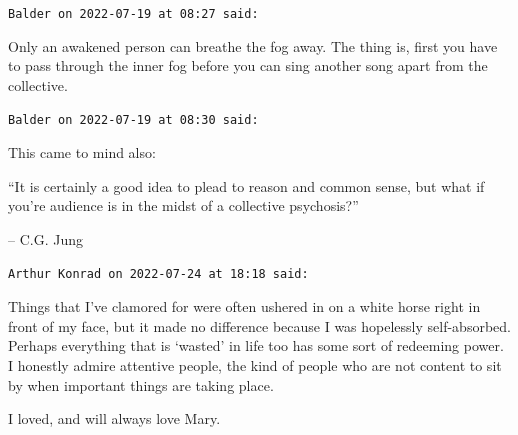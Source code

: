 \begin{footnotesize}
\begin{sffamily}
\texttt{Balder on 2022-07-19 at 08:27 said:}

Only an awakened person can breathe the fog away. The thing is, first you have to pass through the inner fog before you can sing another song apart from the collective.

\hfill

\texttt{Balder on 2022-07-19 at 08:30 said:}

This came to mind also:

``It is certainly a good idea to plead to reason and common sense, but what if you're audience is in the midst of a collective psychosis?''

-- C.G. Jung

\hfill

\texttt{Arthur Konrad on 2022-07-24 at 18:18 said:}

Things that I've clamored for were often ushered in on a white horse right in front of my face, but it made no difference because I was hopelessly self-absorbed. Perhaps everything that is `wasted' in life too has some sort of redeeming power. I honestly admire attentive people, the kind of people who are not content to sit by when important things are taking place.

I loved, and will always love Mary.


\hfill

\end{sffamily}
\end{footnotesize}

